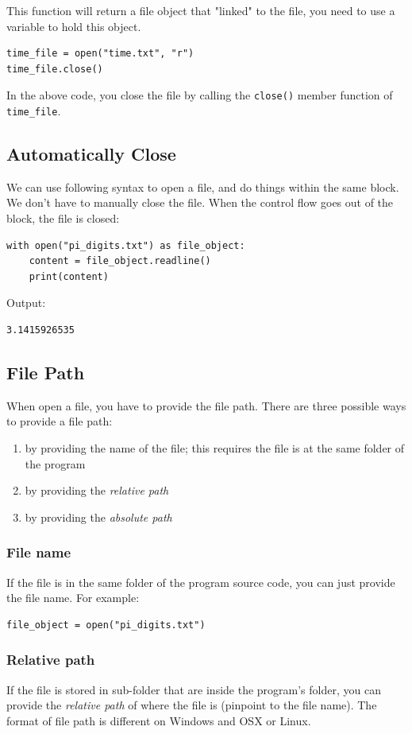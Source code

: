 \documentclass[12pt]{book}
\begin{document}
This function will return a file object that "linked" to the file, you need to use a variable to hold this object.
\begin{verbatim}
time_file = open("time.txt", "r")
time_file.close()
\end{verbatim}
In the above code, you close the file by calling the \texttt{close()} member function of \texttt{time\_file}.
\subsection{Automatically Close}
\label{sec:org76a5cf4}
We can use following syntax to open a file, and do things within the same block. We don't have to manually close the file. When the control flow goes out of the block, the file is closed:
\begin{verbatim}
with open("pi_digits.txt") as file_object:
    content = file_object.readline()
    print(content)
\end{verbatim}
Output:
\begin{verbatim}
3.1415926535
\end{verbatim}
\subsection{File Path}
\label{sec:orgcf727ab}
When open a file, you have to provide the file path. There are three possible ways to provide a file path:
\begin{enumerate}
\item by providing the name of the file; this requires the file is at the same folder of the program
\item by providing the \emph{relative path}
\item by providing the \emph{absolute path}
\end{enumerate}
\subsubsection{File name}
\label{sec:org68b881b}
If the file is in the same folder of the program source code, you can just provide the file name. For example:
\begin{verbatim}
file_object = open("pi_digits.txt")
\end{verbatim}
\subsubsection{Relative path}
\label{sec:org0176bec}
If the file is stored in sub-folder that are inside the program's folder, you can provide the \emph{relative path} of where the file is (pinpoint to the file name). The format of file path is different on Windows and OSX or Linux.
\end{document}
